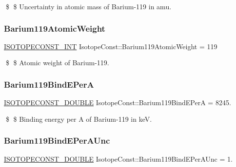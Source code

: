 \$ \$ Uncertainty in atomic mass of Barium-\/119 in amu. \mbox{\label{group___isotope_const-_barium-_ba119_gafb2a47773e2296ec7de6a0533fa16d87}} 
\subsubsection{\texorpdfstring{Barium119\+Atomic\+Weight}{Barium119AtomicWeight}}
{\footnotesize\ttfamily \mbox{\hyperlink{group___isotope_const-_macros_ga5f18360b3e99483a35c32d789e62621c}{I\+S\+O\+T\+O\+P\+E\+C\+O\+N\+S\+T\+\_\+\+I\+NT}} Isotope\+Const\+::\+Barium119\+Atomic\+Weight = 119}

\$ \$ Atomic weight of Barium-\/119. \mbox{\label{group___isotope_const-_barium-_ba119_gafee699b1ffe2cf67b76bbd6892aa091a}} 
\subsubsection{\texorpdfstring{Barium119\+Bind\+E\+PerA}{Barium119BindEPerA}}
{\footnotesize\ttfamily \mbox{\hyperlink{group___isotope_const-_macros_ga8f45a7272ce02c0b4c65c44636ed719a}{I\+S\+O\+T\+O\+P\+E\+C\+O\+N\+S\+T\+\_\+\+D\+O\+U\+B\+LE}} Isotope\+Const\+::\+Barium119\+Bind\+E\+PerA = 8245.}

\$ \$ Binding energy per A of Barium-\/119 in keV. \mbox{\label{group___isotope_const-_barium-_ba119_gadbd920e2b01bbdb4da894ce0fe846f4a}} 
\subsubsection{\texorpdfstring{Barium119\+Bind\+E\+Per\+A\+Unc}{Barium119BindEPerAUnc}}
{\footnotesize\ttfamily \mbox{\hyperlink{group___isotope_const-_macros_ga8f45a7272ce02c0b4c65c44636ed719a}{I\+S\+O\+T\+O\+P\+E\+C\+O\+N\+S\+T\+\_\+\+D\+O\+U\+B\+LE}} Isotope\+Const\+::\+Barium119\+Bind\+E\+Per\+A\+Unc = 1.}

